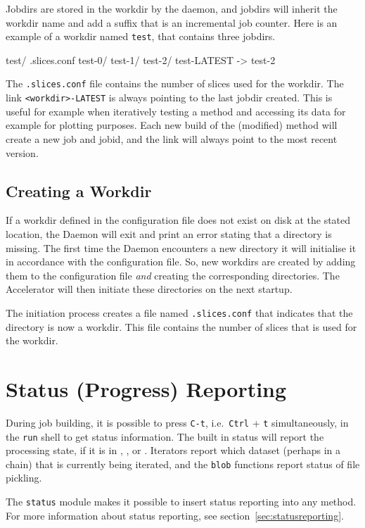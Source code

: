 Jobdirs are stored in the workdir by the daemon, and jobdirs will
inherit the workdir name and add a suffix that is an incremental job
counter.  Here is an example of a workdir named \texttt{test}, that
contains three jobdirs.
\begin{shell}
test/
    .slices.conf
    test-0/
    test-1/
    test-2/
    test-LATEST -> test-2
\end{shell}
The \texttt{.slices.conf} file contains the number of slices used for
the workdir.  The link \texttt{<workdir>-LATEST} is always pointing to
the last jobdir created.  This is useful for example when iteratively
testing a method and accessing its data for example for plotting
purposes.  Each new build of the (modified) method will create a new
job and jobid, and the link will always point to the most recent
version.


\subsection{Creating a Workdir}
If a workdir defined in the configuration file does not exist on disk
at the stated location, the Daemon will exit and print an error
stating that a directory is missing.  The first time the Daemon
encounters a new directory it will initialise it in accordance with
the configuration file.  So, new workdirs are created by adding them
to the configuration file \textsl{and} creating the corresponding
directories.  The Accelerator will then initiate these directories on
the next startup.

The initiation process creates a file named \texttt{.slices.conf} that
indicates that the directory is now a workdir.  This file contains the
number of slices that is used for the workdir.



\section{Status (Progress) Reporting}
During job building, it is possible to press \texttt{C-t},
i.e.\ \texttt{Ctrl} + \texttt{t} simultaneously, in the \texttt{run}
shell to get status information.  The built in status will report the
processing state, if it is in \prepare, \analysis, or \synthesis.
Iterators report which dataset (perhaps in a chain) that is currently
being iterated, and the \texttt{blob} functions report status of file
pickling.

The \texttt{status} module makes it possible to insert
status reporting into any method.  For more information about status
reporting, see section~\ref{sec:statusreporting}.



